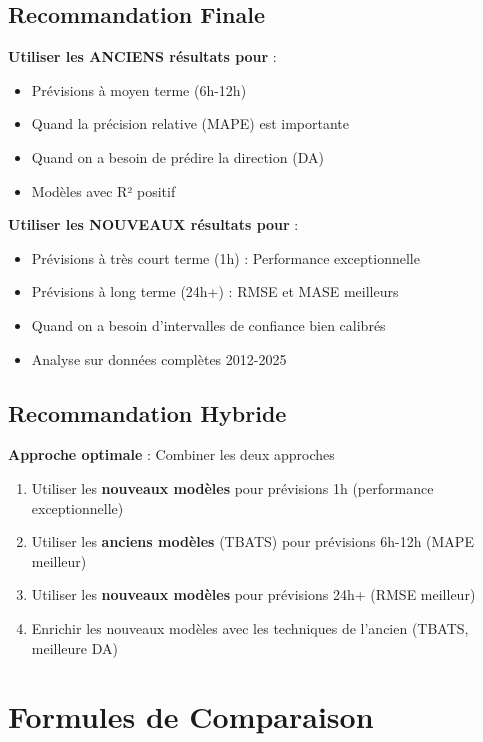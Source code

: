 \documentclass[12pt,a4paper]{article}
\begin{document}
\subsection{Recommandation Finale}

\textbf{Utiliser les ANCIENS résultats pour} :
\begin{itemize}
    \item Prévisions à moyen terme (6h-12h)
    \item Quand la précision relative (MAPE) est importante
    \item Quand on a besoin de prédire la direction (DA)
    \item Modèles avec R² positif
\end{itemize}

\textbf{Utiliser les NOUVEAUX résultats pour} :
\begin{itemize}
    \item Prévisions à très court terme (1h) : Performance exceptionnelle
    \item Prévisions à long terme (24h+) : RMSE et MASE meilleurs
    \item Quand on a besoin d'intervalles de confiance bien calibrés
    \item Analyse sur données complètes 2012-2025
\end{itemize}

\subsection{Recommandation Hybride}

\textbf{Approche optimale} : Combiner les deux approches
\begin{enumerate}
    \item Utiliser les \textbf{nouveaux modèles} pour prévisions 1h (performance exceptionnelle)
    \item Utiliser les \textbf{anciens modèles} (TBATS) pour prévisions 6h-12h (MAPE meilleur)
    \item Utiliser les \textbf{nouveaux modèles} pour prévisions 24h+ (RMSE meilleur)
    \item Enrichir les nouveaux modèles avec les techniques de l'ancien (TBATS, meilleure DA)
\end{enumerate}

\section{Formules de Comparaison}
\end{document}
